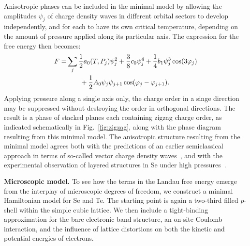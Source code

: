 \documentclass[aps,prl,twocolumn,superscriptaddress,groupedaddress]{revtex4}
\begin{document}
Anisotropic phases can be included in the minimal model by allowing the amplitudes $\psi_j$ of charge density waves in different orbital sectors to develop independently, and for each to have its own critical temperature, depending on the amount of pressure applied along its particular axis. The expression for the free energy then becomes:
\begin{align}
F  =& \sum_j \frac{1}{2}  a_{0}(T,P_j) \psi_j^2 + \frac{3}{8} c_0 \psi_j^4 + \frac{1}{4} b_1 \psi_j^3  \cos(3\varphi_j)  \notag \\ 
& ~~~~~~ + \frac{1}{2} A_0 \psi_j \psi_{j+1} \cos(\varphi_j - \varphi_{j+1}).
\label{GL_P}
\end{align}
Applying pressure along a single axis only, the charge order in a singe direction may be suppressed without destroying the order in orthogonal directions. The result is a phase of stacked planes each containing zigzag charge order, as indicated schematically in Fig.~\ref{fig:zigzag}, along with the phase diagram resulting from this minimal model. The anisotropic structure resulting from the minimal model agrees both with the predictions of an earlier semiclassical approach in terms of so-called vector charge density waves~\cite{fukutome}, and with the experimental observation of layered structures in Se under high pressures~\cite{pressure1,pressure2}.

{\bf Microscopic model.} To see how the terms in the Landau free energy emerge from the interplay of microscopic degrees of freedom, we construct a minimal Hamiltonian model for Se and Te. The starting point is again a two-third filled $p$-shell within the simple cubic lattice. We then include a tight-binding approximation for the bare electronic band structure, an on-site Coulomb interaction, and the influence of lattice distortions on both the kinetic and potential energies of electrons. 
\end{document}

